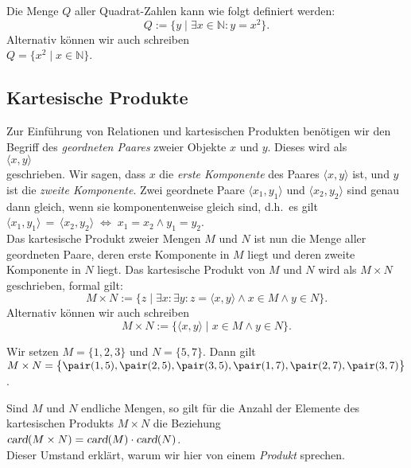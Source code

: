 \example
Die Menge $Q$ aller Quadrat-Zahlen kann wie folgt definiert werden: 
\[ Q := \{ y \mid \exists x \in \mathbb{N}: y = x^2\}. \]
Alternativ können wir auch schreiben
\\[0.2cm]
\hspace*{1.3cm}
$Q = \bigl\{ x^2 \mid x \in \mathbb{N} \bigr\}$. 
\eox

\subsection{Kartesische Produkte}
Zur Einführung von Relationen und kartesischen Produkten benötigen wir den Begriff
des \emph{geordneten Paares} zweier Objekte $x$ und $y$.  Dieses wird  als \\[0.2cm]
\hspace*{1.3cm} $\langle x, y \rangle$ \\[0.2cm]
geschrieben.  Wir sagen, dass $x$ die \emph{erste Komponente} des Paares $\langle x, y \rangle$ ist, 
und $y$ ist die \emph{zweite Komponente}.  Zwei geordnete Paare $\langle x_1, y_1 \rangle$ und $\langle x_2, y_2 \rangle$
sind genau dann gleich, wenn sie komponentenweise gleich sind, d.h.~es gilt \\[0.2cm]
\hspace*{1.3cm} $\langle x_1, y_1 \rangle \,=\,\langle x_2, y_2 \rangle  \;\Leftrightarrow\; x_1 = x_2 \wedge y_1 = y_2$. \\[0.2cm]
Das kartesische Produkt zweier Mengen $M$ und $N$ ist nun die Menge aller geordneten
Paare, deren erste Komponente in $M$ liegt und deren zweite Komponente in $N$ liegt.
Das kartesische Produkt von $M$ und $N$ wird als $M \times N$ geschrieben, formal gilt: 
\[ M \times N := \big\{ z \mid \exists x\colon \exists y\colon z = \langle x,y\rangle \wedge x\in M \wedge y \in N \}. \]
Alternativ können wir auch schreiben
\[ M \times N := \big\{ \langle x,y\rangle \mid  x\in M \wedge y \in N \}. \]

\example
 Wir setzen $M = \{ 1, 2, 3 \}$ und $N = \{ 5, 7 \}$. Dann gilt\\[0.2cm]
\hspace*{1.3cm} 
$M \times N = \bigl\{ \pair(1,5),\pair(2,5),\pair(3,5),\pair(1,7),\pair(2,7),\pair(3,7)\bigr\}$.
\eox

\remark
Sind $M$ und $N$ endliche Mengen, so gilt für die Anzahl der Elemente des kartesischen
Produkts $M \times N$ die Beziehung
\\[0.2cm]
\hspace*{1.3cm}
$\textsl{card}(M \times N) = \textsl{card}(M) \cdot \textsl{card}(N)$.
\\[0.2cm]
Dieser Umstand erklärt, warum wir hier von einem \emph{Produkt} sprechen.  \eox

